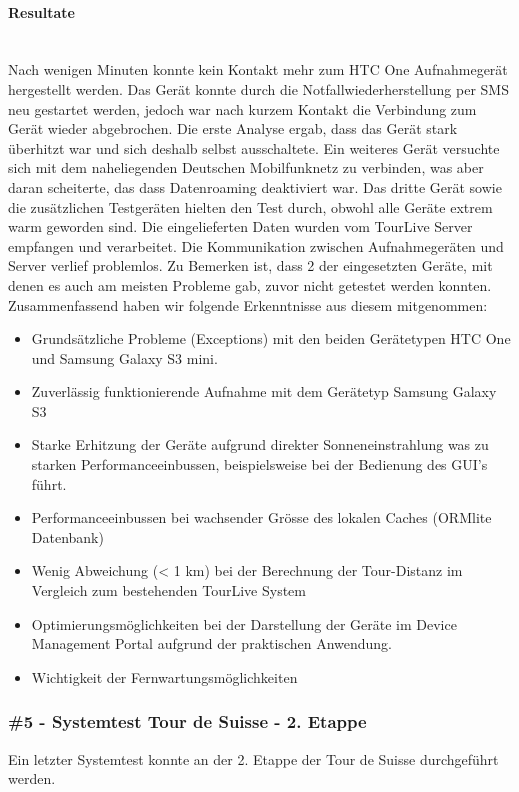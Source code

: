 \paragraph*{Resultate} \mbox{} \\
Nach wenigen Minuten konnte kein Kontakt mehr zum HTC One Aufnahmegerät hergestellt werden. Das Gerät konnte durch die Notfallwiederherstellung per SMS neu gestartet werden, jedoch war nach kurzem Kontakt die Verbindung zum Gerät wieder abgebrochen. Die erste Analyse ergab, dass das Gerät stark überhitzt war und sich deshalb selbst ausschaltete. Ein weiteres Gerät versuchte sich mit dem naheliegenden Deutschen Mobilfunknetz zu verbinden, was aber daran scheiterte, das dass Datenroaming deaktiviert war. Das dritte Gerät sowie die zusätzlichen Testgeräten hielten den Test durch, obwohl alle Geräte extrem warm geworden sind. Die eingelieferten Daten wurden vom TourLive Server empfangen und verarbeitet. Die Kommunikation zwischen Aufnahmegeräten und Server verlief problemlos. Zu Bemerken ist, dass 2 der eingesetzten Geräte, mit denen es auch am meisten Probleme gab, zuvor nicht getestet werden konnten. Zusammenfassend haben wir folgende Erkenntnisse aus diesem mitgenommen:
\begin{itemize} [noitemsep,topsep=0pt]
	\item Grundsätzliche Probleme (Exceptions) mit den beiden Gerätetypen HTC One und Samsung Galaxy S3 mini. 
	\item Zuverlässig funktionierende Aufnahme mit dem Gerätetyp Samsung Galaxy S3
	\item Starke Erhitzung der Geräte aufgrund direkter Sonneneinstrahlung was zu starken Performanceeinbussen, beispielsweise bei der Bedienung des GUI's führt.
	\item Performanceeinbussen bei wachsender Grösse des lokalen Caches (ORMlite Datenbank)
	\item Wenig Abweichung (< 1 km) bei der Berechnung der Tour-Distanz im Vergleich zum bestehenden TourLive System
	\item Optimierungsmöglichkeiten bei der Darstellung der Geräte im Device Management Portal aufgrund der praktischen Anwendung.
	\item Wichtigkeit der Fernwartungsmöglichkeiten
\end{itemize}

\subsubsection{\#5 - Systemtest Tour de Suisse - 2. Etappe}
Ein letzter Systemtest konnte an der 2. Etappe der Tour de Suisse durchgeführt werden.

